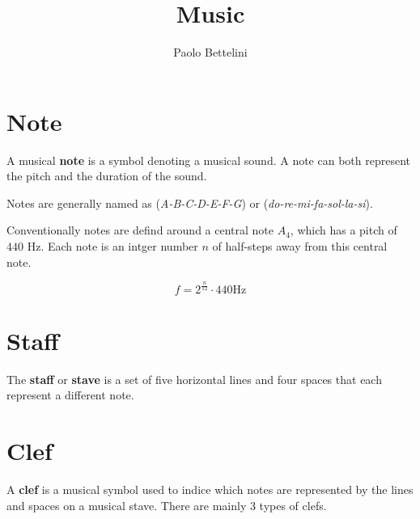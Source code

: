 \documentclass[a4paper]{article}
\title{Music}
\author{Paolo Bettelini}
\date{}
\begin{document}
\maketitle
\tableofcontents
\pagebreak

\section{Note}

A musical \textbf{note} is a symbol denoting a musical sound.
A note can both represent the pitch and the duration of the sound.

Notes are generally named as (\textit{A-B-C-D-E-F-G}) or (\textit{do-re-mi-fa-sol-la-si}).

Conventionally notes are defind around a central note \(A_4\), which has a pitch of
\(440\) Hz. Each note is an intger number \(n\) of half-steps away from this central note.

\[
    f = 2^\frac{n}{12} \cdot 440 \text{Hz}
\]

\section{Staff}

The \textbf{staff} or \textbf{stave} is a set of five horizontal lines and four spaces that each represent a different
note.


\section{Clef}

A \textbf{clef} is a musical symbol used to indice which notes are represented
by the lines and spaces on a musical stave.
There are mainly 3 types of clefs.
\end{document}
